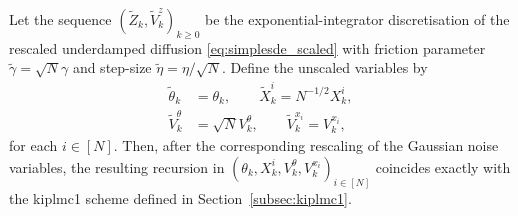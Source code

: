 \begin{proposition}\label{prop:kipld_kiplmc1}
Let the sequence $(\widetilde{Z}_k,\widetilde{V}_k^z)_{k\geq 0}$ be the exponential-integrator discretisation of the rescaled underdamped diffusion \eqref{eq:simplesde_scaled} with friction parameter $\widetilde{\gamma}=\sqrt{N}\gamma$ and step-size $\widetilde{\eta}=\eta/\sqrt{N}$. Define the unscaled variables by
\begin{align*}
\widetilde{\theta}_k &= \theta_k,\qquad \widetilde{X}_k^i = N^{-1/2}X_k^i,\\
\widetilde{V}_k^\theta &= \sqrt{N}V_k^\theta,\qquad \widetilde{V}_k^{x_i} = V_k^{x_i},
\end{align*}
for each $i\in[N]$. Then, after the corresponding rescaling of the Gaussian noise variables, the resulting recursion in $(\theta_k,X_k^i,V_k^\theta,V_k^{x_i})_{i\in[N]}$ coincides exactly with the \gls*{kiplmc1} scheme defined in Section~\ref{subsec:kiplmc1}.
\end{proposition}
